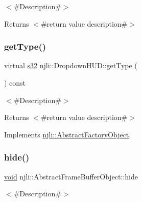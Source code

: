 $<$\#\+Description\#$>$

\begin{DoxyReturn}{Returns}
$<$\#return value description\#$>$ 
\end{DoxyReturn}
\mbox{\label{classnjli_1_1_dropdown_h_u_d_acc19fe8d89c4f9b2d067dee5271b7230}} 
\subsubsection{\texorpdfstring{get\+Type()}{getType()}}
{\footnotesize\ttfamily virtual \mbox{\hyperlink{_util_8h_aa62c75d314a0d1f37f79c4b73b2292e2}{s32}} njli\+::\+Dropdown\+H\+U\+D\+::get\+Type (\begin{DoxyParamCaption}{ }\end{DoxyParamCaption}) const\hspace{0.3cm}{\ttfamily [virtual]}}

$<$\#\+Description\#$>$

\begin{DoxyReturn}{Returns}
$<$\#return value description\#$>$ 
\end{DoxyReturn}


Implements \mbox{\hyperlink{classnjli_1_1_abstract_factory_object_a207c86146d40d0794708ae7f2d4e60a7}{njli\+::\+Abstract\+Factory\+Object}}.

\mbox{\label{classnjli_1_1_dropdown_h_u_d_a5d7b8b3bc421084f282343e506a6d289}} 
\subsubsection{\texorpdfstring{hide()}{hide()}}
{\footnotesize\ttfamily \mbox{\hyperlink{_thread_8h_af1e856da2e658414cb2456cb6f7ebc66}{void}} njli\+::\+Abstract\+Frame\+Buffer\+Object\+::hide}

$<$\#\+Description\#$>$ \mbox{\label{classnjli_1_1_dropdown_h_u_d_a3009efb11b4bcd56bd933c21b230a125}} 

